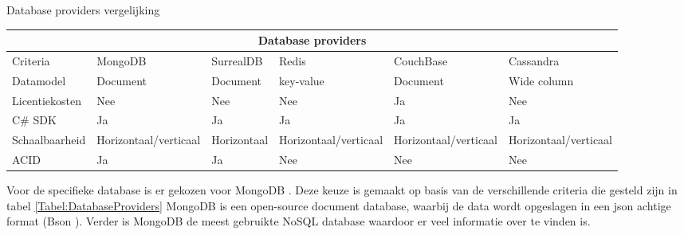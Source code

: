 \whitespace[2]
\begin{graphic}
	\captionsetup{type=table}
	\caption{Database providers vergelijking}
	\begin{tabular}{ |p{6.2em}||p{2.2cm}|p{2.2cm}|p{2.2cm}|p{2.2cm}|p{2.4cm}| }
		\hline
		\multicolumn{6}{|c|}{Database providers}                                                                                                             \\
		\hline
		Criteria       & MongoDB                     & SurrealDB   & Redis                       & CouchBase                   & Cassandra                   \\
		\hline
		Datamodel      & Document                    & Document    & key-value                   & Document                    & Wide column                 \\
		\hline
		Licentiekosten & Nee                         & Nee         & Nee                         & Ja                          & Nee                         \\
		\hline
		C\# SDK        & Ja                          & Ja          & Ja                          & Ja                          & Ja                          \\
		\hline
		Schaalbaarheid & Horizontaal\slash verticaal & Horizontaal & Horizontaal\slash verticaal & Horizontaal\slash verticaal & Horizontaal\slash verticaal \\
		\hline
		ACID           & Ja                          & Ja          & Nee                         & Nee                         & Nee                         \\
		\hline
	\end{tabular}
	\label{Tabel:DatabaseProviders}
\end{graphic}

\whitespace
Voor de specifieke database is er gekozen voor MongoDB \parencite{MongoDB}.
Deze keuze is gemaakt op basis van de verschillende criteria die gesteld zijn in tabel \ref{Tabel:DatabaseProviders}
MongoDB is een open-source document database, waarbij de data wordt opgeslagen in een json achtige format (Bson \parencite{Bson}).
Verder is MongoDB de meest gebruikte NoSQL database waardoor er veel informatie over te vinden is.
